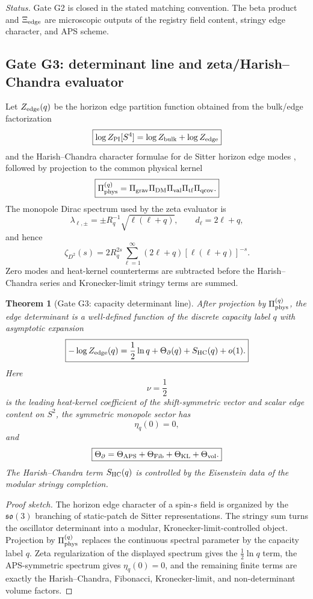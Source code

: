 \documentclass[aps,prd,reprint,nofootinbib,superscriptaddress,floatfix]{revtex4-2}
\numberwithin{equation}{section}
\theoremstyle{definition}
\theoremstyle{plain}
\newtheorem{theorem}{Theorem}[section]
\begin{document}
\noindent\emph{Status.}
Gate G2 is closed in the stated matching convention.  The beta product and
\(\Xi_{\rm edge}\) are microscopic outputs of the registry field content,
stringy edge character, and APS scheme.

\subsection{Gate G3: determinant line and zeta/Harish--Chandra evaluator}

Let \(Z_{\rm edge}(q)\) be the horizon edge partition function obtained from
the bulk/edge factorization
\[
\boxed{
\log Z_{\rm PI}[S^4]
=
\log Z_{\rm bulk}
+
\log Z_{\rm edge}
}
\]
and the Harish--Chandra character formulae for de Sitter horizon edge modes
\cite{Law2025dSEdge,DabholkarHarrisMoitra2026,LawLochab2026}, followed by
projection to the common physical kernel
\[
\boxed{
\Pi_{\rm phys}^{(q)}
=
\Pi_{\rm grav}\Pi_{\rm DM}\Pi_{\rm val}\Pi_{\rm tf}\Pi_{\rm qcov}.
}
\]
The monopole Dirac spectrum used by the zeta evaluator is
\[
\boxed{
\lambda_{\ell,\pm}
=
\pm R_q^{-1}\sqrt{\ell(\ell+q)},
\qquad
d_\ell=2\ell+q,
}
\]
and hence
\[
\boxed{
\zeta_{D^2}(s)
=
2R_q^{2s}
\sum_{\ell=1}^{\infty}
(2\ell+q)[\ell(\ell+q)]^{-s}.
}
\]
Zero modes and heat-kernel counterterms are subtracted before the
Harish--Chandra series and Kronecker-limit stringy terms are summed.

\begin{theorem}[Gate G3: capacity determinant line]
\label{thm:gate-determinant}
After projection by \(\Pi_{\rm phys}^{(q)}\), the edge determinant is a
well-defined function of the discrete capacity label \(q\) with asymptotic
expansion
\[
\boxed{
-\log Z_{\rm edge}(q)
=
\frac12\ln q
+
\Theta_\partial(q)
+
S_{\rm HC}(q)
+
o(1).
}
\]
Here
\[
\boxed{\nu=\frac12}
\]
is the leading heat-kernel coefficient of the shift-symmetric vector and
scalar edge content on \(S^2\), the symmetric monopole sector has
\[
\boxed{\eta_q(0)=0,}
\]
and
\[
\boxed{
\Theta_\partial
=
\Theta_{\rm APS}
+
\Theta_{\rm Fib}
+
\Theta_{\rm KL}
+
\Theta_{\rm vol}.
}
\]
The Harish--Chandra term \(S_{\rm HC}(q)\) is controlled by the Eisenstein data
of the modular stringy completion.
\end{theorem}

\begin{proof}[Proof sketch]
The horizon edge character of a spin-\(s\) field is organized by the
\(\mathfrak{so}(3)\) branching of static-patch de Sitter representations.
The stringy sum turns the oscillator determinant into a modular,
Kronecker-limit-controlled object.  Projection by \(\Pi_{\rm phys}^{(q)}\)
replaces the continuous spectral parameter by the capacity label \(q\).  Zeta
regularization of the displayed spectrum gives the \(\frac12\ln q\) term,
the APS-symmetric spectrum gives \(\eta_q(0)=0\), and the remaining finite
terms are exactly the Harish--Chandra, Fibonacci, Kronecker-limit, and
non-determinant volume factors.
\end{proof}
\end{document}
